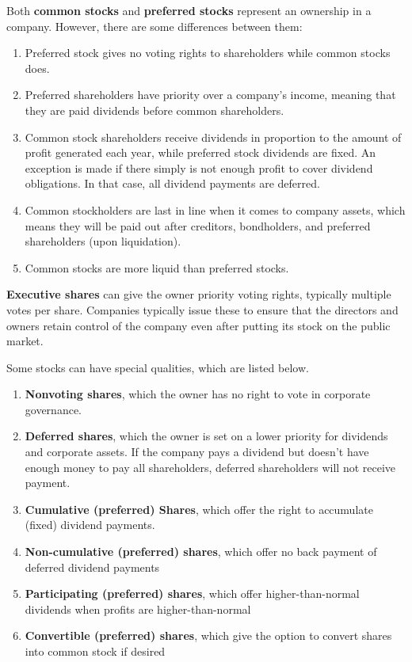 \documentclass{article}
\begin{document}
  \begin{definition}
    Both \textbf{common stocks} and \textbf{preferred stocks} represent an ownership in a company. However, there are some differences between them: 
    \begin{enumerate}
      \item Preferred stock gives no voting rights to shareholders while common stocks does. 
      \item Preferred shareholders have priority over a company's income, meaning that they are paid dividends before common shareholders. 
      \item Common stock shareholders receive dividends in proportion to the amount of profit generated each year, while preferred stock dividends are fixed. An exception is made if there simply is not enough profit to cover dividend obligations. In that case, all dividend payments are deferred. 
      \item Common stockholders are last in line when it comes to company assets, which means they will be paid out after creditors, bondholders, and preferred shareholders (upon liquidation). 
      \item Common stocks are more liquid than preferred stocks. 
    \end{enumerate}
    \textbf{Executive shares} can give the owner priority voting rights, typically multiple votes per share. Companies typically issue these to ensure that the directors and owners retain control of the company even after putting its stock on the public market. 
  \end{definition}

  Some stocks can have special qualities, which are listed below. 
  \begin{enumerate}
    \item \textbf{Nonvoting shares}, which the owner has no right to vote in corporate governance. 
    \item \textbf{Deferred shares}, which the owner is set on a lower priority for dividends and corporate assets. If the company pays a dividend but doesn’t have enough money to pay all shareholders, deferred shareholders will not receive payment. 
    \item \textbf{Cumulative (preferred) Shares}, which offer the right to accumulate (fixed) dividend payments. 
    \item \textbf{Non-cumulative (preferred) shares}, which offer no back payment of deferred dividend payments
    \item \textbf{Participating (preferred) shares}, which offer higher-than-normal dividends when profits are higher-than-normal
    \item \textbf{Convertible (preferred) shares}, which give the option to convert shares into common stock if desired 
  \end{enumerate}
\end{document}
